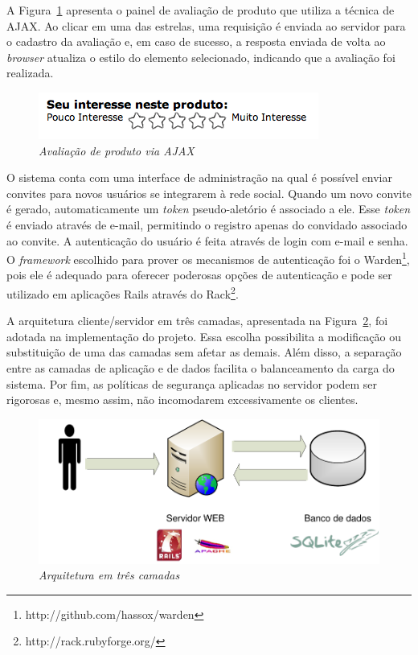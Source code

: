 A Figura~\ref{fig:rater-ajax} apresenta o painel de avaliação de produto que utiliza a técnica de AJAX. Ao clicar em uma das estrelas, uma requisição é enviada ao servidor para o cadastro da avaliação e, em caso de sucesso, a resposta enviada de volta ao \emph{browser} atualiza o estilo do elemento selecionado, indicando que a avaliação foi realizada.
\begin{figure}
 \centering
 \includegraphics{imagens/rater-ajax}
 \caption{\it Avaliação de produto via AJAX}
 \label{fig:rater-ajax}
\end{figure}

O sistema conta com uma interface de administração na qual é possível enviar convites para novos usuários se integrarem à rede social. Quando um novo convite é gerado, automaticamente um \emph{token} pseudo-aletório é associado a ele. Esse \emph{token} é enviado através de e-mail, permitindo o registro apenas do convidado associado ao convite. A autenticação do usuário é feita através de login com e-mail e senha. O \emph{framework} escolhido para prover os mecanismos de autenticação foi o Warden\footnote{http://github.com/hassox/warden}, pois ele é adequado para oferecer poderosas opções de autenticação e pode ser utilizado em aplicações Rails através do Rack\footnote{http://rack.rubyforge.org/}.

A arquitetura cliente/servidor em três camadas, apresentada na Figura~\ref{fig:three_tier}, foi adotada na implementação do projeto. Essa escolha possibilita a modificação ou substituição de uma das camadas sem afetar as demais. Além disso, a separação entre as camadas de aplicação e de dados facilita o balanceamento da carga do sistema. Por fim, as políticas de segurança aplicadas no servidor podem ser rigorosas e, mesmo assim, não incomodarem excessivamente os clientes.

\begin{figure}
 \centering
 \includegraphics[width=\textwidth]{imagens/Implementacao_Detalhe}
 \caption{\it Arquitetura em três camadas}
 \label{fig:three_tier}
\end{figure}


